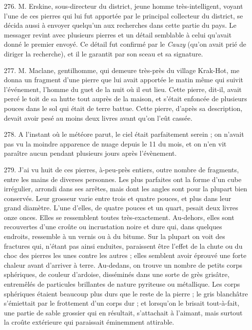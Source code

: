\documentclass[a4paper, 11pt, oneside, polutonikogreek, french]{article}
\begin{document}
276. M. Erskine, sous-directeur du district, jeune homme très-intelligent, voyant l'une de ces pierres qui lui fut apportée par le principal collecteur du district, se décida aussi à envoyer quelqu'un aux recherches dans cette partie du pays. Le messager revint avec plusieurs pierres et un détail semblable à celui qu'avait donné le premier envoyé. Ce détail fut confirmé par le \emph{Cauzy} (qu'on avait prié de diriger la recherche), et il le garantit par son sceau et sa signature.

277. M. Maclane, gentilhomme, qui demeure très-près du village Krak-Hot, me donna un fragment d'une pierre que lui avait apportée le matin même qui suivit l'événement, l'homme du guet de la nuit où il eut lieu. Cette pierre, dit-il, avait percé le toit de sa hutte tout auprès de la maison, et s'était enfoncée de plusieurs pouces dans le sol qui était de terre battue. Cette pierre, d'après sa description, devait avoir pesé au moins deux livres avant qu'on l'eût cassée.

278. A l'instant où le météore parut, le ciel était parfaitement serein ; on n'avait pas vu la moindre apparence de nuage depuis le 11 du mois, et on n'en vit paraître aucun pendant plusieurs jours après l'évènement.

279. J'ai vu huit de ces pierres, à-peu-près entiers, outre nombre de fragments, entre les mains de diverses personnes. Les plus parfaites ont la forme d'un cube irrégulier, arrondi dans ses arrêtes, mais dont les angles sont pour la plupart bien conservés. Leur grosseur varie entre trois et quatre pouces, et plus dans leur grand diamètre. L'une d'elles, de quatre pouces et un quart, pesait deux livres onze onces. Elles se ressemblent toutes très-exactement. Au-dehors, elles sont recouvertes d'une croûte ou incrustation noire et dure qui, dans quelques endroits, ressemble à un vernis ou à du bitume. Sur la plupart on voit des fractures qui, n'étant pas ainsi enduites, paraissent être l'effet de la chute ou du choc des pierres les unes contre les autres ; elles semblent avoir éprouvé une forte chaleur avant d'arriver à terre. Au-dedans, on trouve un nombre de petits corps sphériques, de couleur d'ardoise, disséminés dans une sorte de grès grisâtre, entremêlés de particules brillantes de nature pyriteuse ou métallique. Les corps sphériques étaient beaucoup plus durs que le reste de la pierre ; le gris blanchâtre s'émiettait par le frottement d'un corps dur ; et lorsqu'on le brisait tout-à-fait, une partie de sable grossier qui en résultait, s'attachait à l'aimant, mais surtout la croûte extérieure qui paraissait éminemment attirable.
\end{document}
